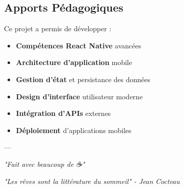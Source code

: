 \documentclass[12pt,a4paper]{article}
\begin{document}
\subsection{Apports Pédagogiques}

Ce projet a permis de développer :

\begin{itemize}
    \item \textbf{Compétences React Native} avancées
    \item \textbf{Architecture d'application} mobile
    \item \textbf{Gestion d'état} et persistance des données
    \item \textbf{Design d'interface} utilisateur moderne
    \item \textbf{Intégration d'APIs} externes
    \item \textbf{Déploiement} d'applications mobiles
\end{itemize}

---

\begin{center}
\textit{"Fait avec beaucoup de ☕"}

\textit{"Les rêves sont la littérature du sommeil" - Jean Cocteau}
\end{center}
\end{document}
